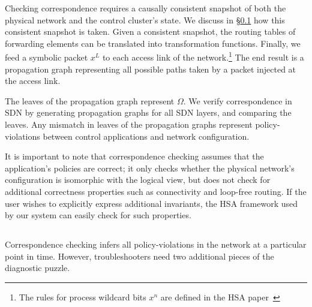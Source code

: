 Checking correspondence requires a causally consistent
snapshot of both the physical network and the
control cluster's state. We discuss in \S\ref{sec:causal_analysis} how this consistent snapshot
is taken. Given a consistent
snapshot, the routing
tables of forwarding elements can be translated into transformation functions.
Finally, we feed a symbolic packet $x^L$ to each access link of the
network.\footnote{The rules for process wildcard bits $x^n$ are defined in
the HSA paper~\cite{hsa}} The end result is a propagation graph representing all possible paths taken by a packet injected
at the access link.

The leaves of the propagation graph represent $\Omega$. We
verify correspondence in SDN by generating propagation graphs for all SDN layers,
and comparing the leaves. Any mismatch in leaves of the propagation graphs
represent policy-violations between control applications and network
configuration.

It is important to note that correspondence checking assumes that the
application's policies are correct; it only checks whether the physical
network's configuration is isomorphic with the logical view, but does not
check for additional correctness properties such as connectivity and
loop-free routing. If the user wishes to explicitly express additional
invariants, the HSA framework used by our system can
easily check for such properties.

\subsection{\SIMULATOR{}}
\label{sec:causal_analysis}




Correspondence checking infers all policy-violations in the network at a
particular point in time. However, troubleshooters
need two additional pieces of the diagnostic puzzle.

